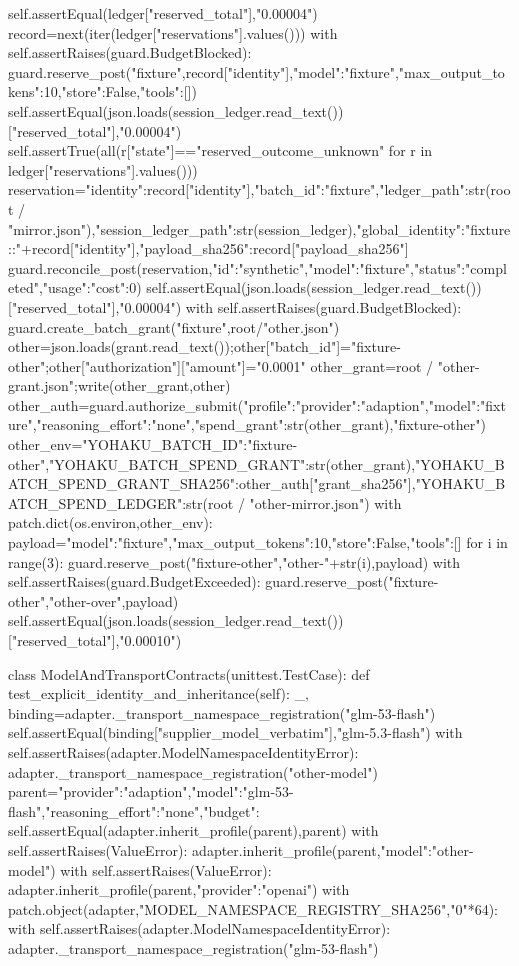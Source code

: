                 self.assertEqual(ledger["reserved_total"],"0.00004")
                record=next(iter(ledger["reservations"].values()))
                with self.assertRaises(guard.BudgetBlocked):
                    guard.reserve_post("fixture",record["identity"],{"model":"fixture","max_output_tokens":10,"store":False,"tools":[]})
                self.assertEqual(json.loads(session_ledger.read_text())["reserved_total"],"0.00004")
                self.assertTrue(all(r["state"]=="reserved_outcome_unknown" for r in ledger["reservations"].values()))
                reservation={"identity":record["identity"],"batch_id":"fixture","ledger_path":str(root / "mirror.json"),"session_ledger_path":str(session_ledger),"global_identity":"fixture::"+record["identity"],"payload_sha256":record["payload_sha256"]}
                guard.reconcile_post(reservation,{"id":"synthetic","model":"fixture","status":"completed","usage":{"cost":0}})
                self.assertEqual(json.loads(session_ledger.read_text())["reserved_total"],"0.00004")
                with self.assertRaises(guard.BudgetBlocked): guard.create_batch_grant("fixture",root/"other.json")
                other=json.loads(grant.read_text());other["batch_id"]="fixture-other";other["authorization"]["amount"]="0.0001"
                other_grant=root / "other-grant.json";write(other_grant,other)
                other_auth=guard.authorize_submit({"profile":{"provider":"adaption","model":"fixture","reasoning_effort":"none"},"spend_grant":str(other_grant)},"fixture-other")
                other_env={"YOHAKU_BATCH_ID":"fixture-other","YOHAKU_BATCH_SPEND_GRANT":str(other_grant),"YOHAKU_BATCH_SPEND_GRANT_SHA256":other_auth["grant_sha256"],"YOHAKU_BATCH_SPEND_LEDGER":str(root / "other-mirror.json")}
                with patch.dict(os.environ,other_env):
                    payload={"model":"fixture","max_output_tokens":10,"store":False,"tools":[]}
                    for i in range(3): guard.reserve_post("fixture-other","other-"+str(i),payload)
                    with self.assertRaises(guard.BudgetExceeded): guard.reserve_post("fixture-other","other-over",payload)
                    self.assertEqual(json.loads(session_ledger.read_text())["reserved_total"],"0.00010")

class ModelAndTransportContracts(unittest.TestCase):
    def test_explicit_identity_and_inheritance(self):
        _, binding=adapter._transport_namespace_registration("glm-53-flash")
        self.assertEqual(binding["supplier_model_verbatim"],"glm-5.3-flash")
        with self.assertRaises(adapter.ModelNamespaceIdentityError): adapter._transport_namespace_registration("other-model")
        parent={"provider":"adaption","model":"glm-53-flash","reasoning_effort":"none","budget":{}}
        self.assertEqual(adapter.inherit_profile(parent),parent)
        with self.assertRaises(ValueError): adapter.inherit_profile(parent,{"model":"other-model"})
        with self.assertRaises(ValueError): adapter.inherit_profile(parent,{"provider":"openai"})
        with patch.object(adapter,"MODEL_NAMESPACE_REGISTRY_SHA256","0"*64):
            with self.assertRaises(adapter.ModelNamespaceIdentityError): adapter._transport_namespace_registration("glm-53-flash")

